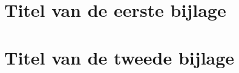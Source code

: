 \chapter{Titel van de eerste bijlage}
\lipsum[59-60]
\chapter{Titel van de tweede bijlage}
\lipsum[61-62]
